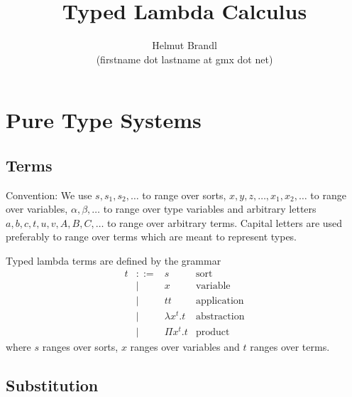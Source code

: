 \documentclass[12pt]{article}
\begin{document}
\title{Typed Lambda Calculus}
\author{Helmut Brandl \\ \scriptsize (firstname dot lastname at gmx dot net)}
\date{}


\maketitle

\abstract{
}

\tableofcontents




\newpage
\section{Pure Type Systems}

\subsection{Terms}

Convention: We use $s,s_1,s_2,\ldots$ to range over sorts,
$x,y,z,\ldots,x_1,x_2,\ldots$ to range over variables, $\alpha,\beta,\ldots$
to range over type variables and arbitrary letters $a,b,c,t,u,v,A,B,C,\ldots$
to range over arbitrary terms. Capital letters are used preferably to range
over terms which are meant to represent types.

\begin{definition}
  Typed lambda terms are defined by the grammar
  $$
  \begin{array}{llll}
    t &::=& s                 &\text{sort}
    \\
      &\mid& x                &\text{variable}
    \\
      &\mid& t t              &\text{application}
    \\
      &\mid& \lambda x^t.t    &\text{abstraction}
    \\
      &\mid& \Pi x^t.t        &\text{product}
  \end{array}
  $$
  where $s$ ranges over sorts, $x$ ranges over variables and $t$ ranges over
  terms.
\end{definition}


\subsection{Substitution}
\end{document}
